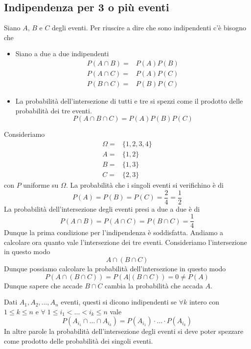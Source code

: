\subsection{Indipendenza per 3 o più eventi}
Siano $A$, $B$ e $C$ degli eventi. Per riuscire a dire che sono indipendenti c'è bisogno che
\begin{itemize}
	\item Siano a due a due indipendenti
	      \begin{align*}
		      P(A \cap B) = & P(A) P(B) \\
		      P(A \cap C) = & P(A) P(C) \\
		      P(B \cap C) = & P(B) P(C)
	      \end{align*}
	\item La probabilità dell'intersezione di tutti e tre si spezzi come il prodotto delle
	      probabilità dei tre eventi.
	      \[ P(A \cap B \cap C) = P(A) P(B) P(C) \]
\end{itemize}

\begin{example}
	Consideriamo
	\begin{align*}
		\Omega = & \{ 1, 2, 3, 4 \} \\
		A =      & \{ 1, 2 \}       \\
		B =      & \{ 1, 3 \}       \\
		C =      & \{ 2, 3 \}
	\end{align*}
	con $P$ uniforme su $\Omega$. La probabilità che i singoli eventi si verifichino è di
	\[ P(A) = P(B) = P(C) = \frac{2}{4} = \frac{1}{2} \]
	La probabilità dell'intersezione degli eventi presi a due a due è di
	\[ P(A \cap B) = P(A \cap C) = P(B \cap C) = \frac{1}{4} \]
	Dunque la prima condizione per l'indipendenza è soddisfatta. Andiamo a calcolare ora quanto
	vale l'intersezione dei tre eventi. Consideriamo l'intersezione in questo modo
	\[ A \cap (B \cap C) \]
	Dunque possiamo calcolare la probabilità dell'intersezione in questo modo
	\[ P(A \cap (B \cap C)) = P(A | (B \cap C)) = 0 \neq P(A) \]
	Dunque sapere che accade $B \cap C$ cambia la probabilità che accada $A$.
\end{example}

\begin{definition}
	Dati $A_1, A_2, ..., A_n$ eventi, questi si dicono indipendenti se $\forall k$ intero con
	$1 \leq k \leq n$ e $\forall \; 1 \leq i_1 < ... < i_k \leq n$ vale
	\[ P(A_{i_1} \cap ... \cap A_{i_k}) = P(A_{i_1}) \cdot ... \cdot P(A_{i_k}) \]
	In altre parole la probabilità dell'intersezione degli eventi si deve poter spezzare come
	prodotto delle probabilità dei singoli eventi.
\end{definition}

